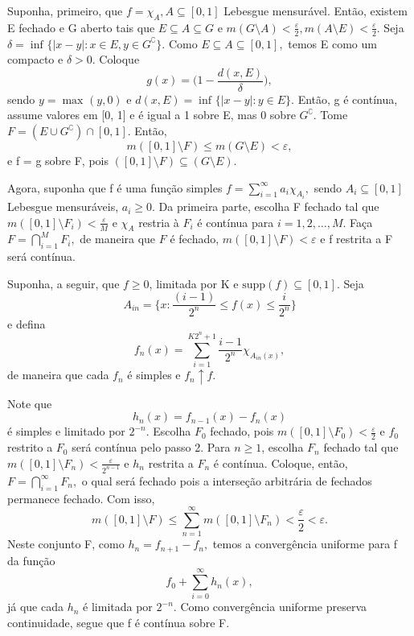 \documentclass[measure_theory.tex]{subfiles}
\begin{document}
\begin{proof*}
	Suponha, primeiro, que \(f = \chi_{A}, A\subseteq [0, 1]\) Lebesgue mensurável. Então, existem E fechado e G aberto tais que \(E\subseteq A\subseteq G\) e \(m(G\setminus{A}) < \frac{\varepsilon }{2}, m(A\setminus{E}) < \frac{\varepsilon }{2}\).
	Seja \(\delta = \inf_{}\{|x-y|: x\in E, y\in G ^{\complement}\}.\) Como \(E\subseteq A\subseteq [0, 1],\) temos E como um compacto e \(\delta  > 0.\) Coloque
	\[
		g(x) = \biggl(1 - \frac{d(x, E)}{\delta }\biggr),
	\]
	sendo \(y = \max_{}(y, 0)\) e \(d(x, E) = \inf_{}\{|x-y|:y\in E\}.\) Então, g é contínua, assume valores em [0, 1] e é igual a 1 sobre E, mas 0 sobre \(G ^{\complement}.\) Tome
	\(F = (E\cup G ^{\complement})\cap [0, 1].\) Então,
	\[
		m([0, 1]\setminus{F}) \leq m(G\setminus{E}) < \varepsilon,
	\]
	e f = g sobre F, pois \(([0, 1]\setminus{F})\subseteq (G\setminus{E}).\)

	Agora, suponha que f é uma função simples \(f = \sum\limits_{i=1}^{\infty}a_{i}\chi_{A_{i}},\) sendo \(A_{i}\subseteq [0, 1]\) Lebesgue mensuráveis, \(a_{i} \geq 0.\) Da primeira parte, escolha
	F fechado tal que \(m([0, 1]\setminus{F_{i}}) < \frac{\varepsilon }{M}\) e \(\chi_{A}\) restria à \(F_{i}\) é contínua para \(i=1,2,\dotsc , M.\) Faça \(F = \bigcap_{i=1}^{M}F_{i},\) de maneira que \(F\) é fechado, \(m([0,1]\setminus{F}) < \varepsilon \)
	e f restrita a F será contínua.

	Suponha, a seguir, que \(f\geq 0\), limitada por K e \(\mathrm{supp}(f)\subseteq [0, 1].\) Seja
	\[
		A_{in} = \biggl\{x: \frac{(i-1)}{2^{n}} \leq f(x) \leq \frac{i}{2^{n}}\biggr\}
	\]
	e defina
	\[
		f_{n}(x) = \sum\limits_{i=1}^{K2^{n}+1}\frac{i-1}{2^{n}}\chi_{A_{in}(x)},
	\]
	de maneira que cada \(f_{n}\) é simples e \(f_{n}\uparrow f.\)

	Note que
	\[
		h_{n}(x) = f_{n-1}(x) - f_{n}(x)
	\]
	é simples e limitado por \(2^{-n}.\) Escolha \(F_{0}\) fechado, pois \(m([0, 1]\setminus{F_{0}}) < \frac{\varepsilon }{2}\) e \(f_{0}\) restrito a \(F_{0}\) será contínua pelo passo 2.
	Para \(n\geq 1\), escolha \(F_{n}\) fechado tal que \(m([0, 1]\setminus{F_{n}}) < \frac{\varepsilon }{2^{n-1}}\) e \(h_{n}\) restrita a \(F_{n}\) é contínua. Coloque, então, \(F = \bigcap_{i=1}^{\infty}F_{n},\) o qual
	será fechado pois a interseção arbitrária de fechados permanece fechado. Com isso,
	\[
		m([0,1]\setminus{F}) \leq \sum\limits_{n=1}^{\infty}m([0, 1]\setminus{F_{n}}) < \frac{\varepsilon }{2} < \varepsilon .
	\]
	Neste conjunto F, como \(h_{n} = f_{n+1}-f_{n},\) temos a convergência uniforme para f da função
	\[
		f_{0} + \sum\limits_{i=0}^{\infty}h_{n}(x),
	\]
	já que cada \(h_{n}\) é limitada por \(2^{-n}.\) Como convergência uniforme preserva continuidade, segue que f é contínua sobre F.


\end{proof*}
\end{document}
